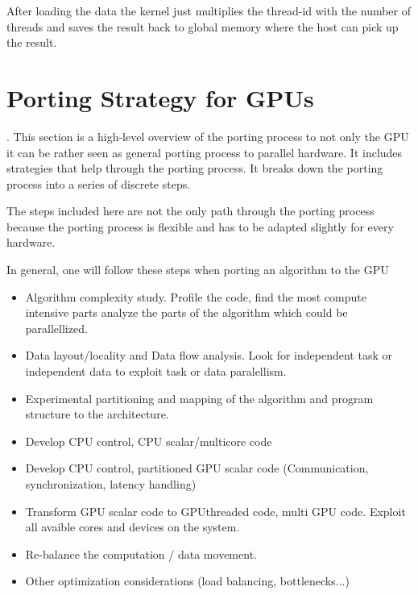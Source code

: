 After loading the data the kernel just multiplies the thread-id with the number
of threads and saves the result back to global memory where the host can pick up
the result.

\section{Porting Strategy for GPUs}.%
\label{sec:porting_strategies_for_gpu} 
This section  is a high-level overview of the porting process to not only
the \gls{GPU} it can be rather seen as general porting process to parallel 
hardware. It includes strategies that help through the porting process. It 
breaks down the porting process into a series of discrete steps. 

The steps included here are not the only path through the porting process because
the porting process is flexible and has to be adapted slightly for every hardware. 

In general, one will follow these steps when porting an algorithm to the \gls{GPU}
\begin{itemize}
	\item Algorithm complexity study. Profile the code, find the most compute
intensive parts analyze the parts of the algorithm which could be parallellized.
	\item Data layout/locality and Data flow analysis. Look for independent task or 
	independent data to exploit task or data paralellism.
	\item Experimental partitioning and mapping of the algorithm and program 
		structure to the architecture. 
	\item Develop \gls{CPU} control, \gls{CPU} scalar/multicore code
	\item Develop \gls{CPU} control, partitioned \gls{GPU} scalar code (Communication, 
		synchronization, latency handling)
	\item Transform \gls{GPU} scalar code to \gls{GPU}threaded code, multi \gls{GPU} code. 
	Exploit all avaible cores and devices on the system. 
	\item Re-balance the computation / data movement. 
	\item Other optimization considerations (load balancing, bottlenecks...)
\end{itemize}



